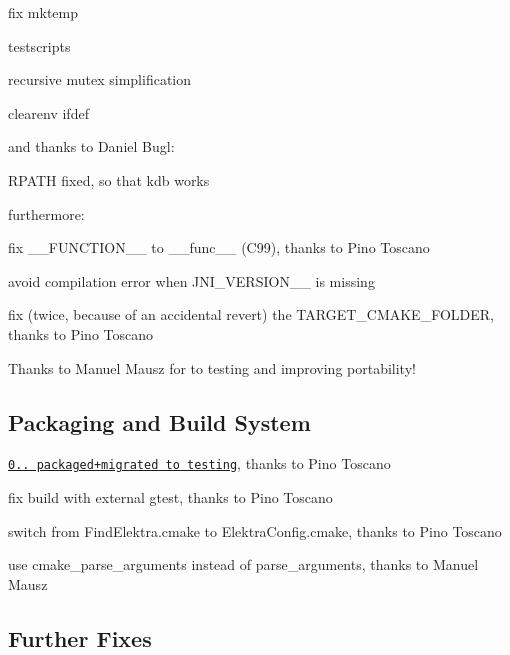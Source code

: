 \begin{DoxyItemize}
\item fix mktemp
\item testscripts
\item recursive mutex simplification
\item clearenv ifdef
\end{DoxyItemize}

and thanks to Daniel Bugl\+:


\begin{DoxyItemize}
\item R\+P\+A\+TH fixed, so that {\ttfamily kdb} works
\end{DoxyItemize}

furthermore\+:


\begin{DoxyItemize}
\item fix {\ttfamily \+\_\+\+\_\+\+F\+U\+N\+C\+T\+I\+O\+N\+\_\+\+\_\+} to {\ttfamily \+\_\+\+\_\+func\+\_\+\+\_\+} (C99), thanks to Pino Toscano
\item avoid compilation error when J\+N\+I\+\_\+\+V\+E\+R\+S\+I\+O\+N\+\_\+\_ is missing
\item fix (twice, because of an accidental revert) the T\+A\+R\+G\+E\+T\+\_\+\+C\+M\+A\+K\+E\+\_\+\+F\+O\+L\+D\+ER, thanks to Pino Toscano
\end{DoxyItemize}

Thanks to Manuel Mausz for to testing and improving portability!

\subsection*{Packaging and Build System}


\begin{DoxyItemize}
\item \href{https://packages.qa.debian.org/e/elektra/news/20150726T155000Z.html}{\tt 0.. packaged+migrated to testing}, thanks to Pino Toscano
\item fix build with external gtest, thanks to Pino Toscano
\item switch from Find\+Elektra.\+cmake to Elektra\+Config.\+cmake, thanks to Pino Toscano
\item use {\ttfamily cmake\+\_\+parse\+\_\+arguments} instead of {\ttfamily parse\+\_\+arguments}, thanks to Manuel Mausz
\end{DoxyItemize}

\subsection*{Further Fixes}


